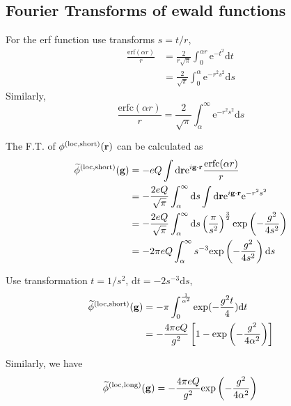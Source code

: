 \documentclass[paper=a4, fontsize=11pt]{article} %
\numberwithin{equation}{section} %
\numberwithin{figure}{section} %
\numberwithin{table}{section} %
\newcommand{\wt}{\widetilde}
\newcommand{\bg}{{\bf{g}}}
\newcommand{\br}{{\bf{r}}}
\newcommand{\rexp}{{\mathrm{exp}}}
\newcommand{\re}{{\mathrm{e}}}
\newcommand{\rshort}{{\mathrm{short}}}
\newcommand{\rlong}{{\mathrm{long}}}
\newcommand{\rerf}{{\mathrm{erf}}}
\newcommand{\rerfc}{{\mathrm{erfc}}}
\newcommand{\rd}{{\mathrm{d}}}
\newcommand{\rlo}{{\mathrm{loc}}}
\newcommand{\ibgr}{i\bg\cdot\br}
\begin{document}
\subsection{Fourier Transforms of ewald functions}
For the erf function use transforms $s=t/r$, 
\begin{equation}
\begin{split}
\frac{\rerf(\alpha r)}{r}
&= \frac{2}{r \sqrt{\pi}}\int_0^{\alpha r}\re^{-t^2} \rd t \\
&= \frac{2}{\sqrt{\pi}}\int_0^{\alpha}\re^{-r^2 s^2} \rd s
\end{split}
\end{equation}
Similarly,
\begin{equation}
\frac{\rerfc(\alpha r)}{r}
= \frac{2}{\sqrt{\pi}}\int_\alpha^{\infty} \re^{-r^2 s^2} \rd s
\end{equation}


The F.T. of $\phi^{(\rlo,\rshort)}(\br)$ can be calculated as
\begin{equation}
\begin{split}
\wt{\phi}^{(\rlo,\rshort)}(\bg)
&= -eQ\int \rd\br \re^{\ibgr}\frac{\rerfc(\alpha r)}{r} \\
&= -\frac{2 eQ}{\sqrt{\pi}}\int_\alpha^\infty \rd s \int \rd \br \re^{\ibgr} \re^{-r^2 s^2} \\
&= -\frac{2eQ}{\sqrt{\pi}}\int_\alpha^\infty \rd s \left(\frac{\pi}{s^2}\right)^{\frac{3}{2}}\rexp\left(-\frac{g^2}{4s^2}\right)  \\
&= -2\pi eQ \int_\alpha^\infty s^{-3}\rexp\left(-\frac{g^2}{4s^2}\right) \rd s
\end{split}
\end{equation}

Use transformation $t = 1/s^2$, $\rd t = -2s^{-3} \rd s$,
\begin{equation}
\begin{split}
\wt{\phi}^{(\rlo,\rshort)}(\bg)
&= -\pi \int_0^{\frac{1}{\alpha^2}}\rexp(-\frac{g^2 t}{4}) \rd t \\
&= -\frac{4\pi eQ}{g^2}\left[1-\rexp\left(-\frac{g^2}{4\alpha^2}\right)\right] \\
\end{split}
\end{equation}

Similarly, we have
\begin{equation}
\wt {\phi}^{(\rlo,\rlong)}(\bg)= -\frac{4\pi eQ}{g^2}\rexp\left(-\frac{g^2}{4\alpha^2}\right) \\
\end{equation}
\end{document}
